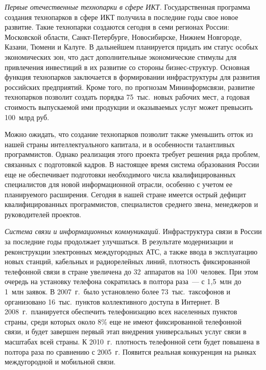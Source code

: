 \begin{multicols}{2}
     \vspace*{1pt}
     \textit{Первые отечественные технопарки в сфере ИКТ.} Государственная
программа создания технопарков в сфере ИКТ получила в последние годы свое новое
развитие. Такие технопарки создаются сегодня в семи регионах России: Московской
области, Санкт-Петербурге, Новосибирске, Нижнем Новгороде, Казани, Тюмени и Калуге.
В дальнейшем планируется придать им статус особых экономических зон, что даст
дополнительные экономические стимулы для привлечения инвестиций в их развитие со
стороны бизнес-структур. Основная функция технопарков заключается в формировании
инфраструктуры для развития российских предприятий. Кроме того, по прогнозам
Мининформсвязи, развитие технопарков позволит создать порядка 75~тыс.\ новых
рабочих мест, а годовая стоимость выпускаемой ими продукции и оказываемых услуг
может превысить 100~млрд руб.

     Можно ожидать, что создание технопарков позволит также уменьшить отток из
нашей страны интеллектуального капитала, и в особенности та\-лант\-ли\-вых программистов.
Однако реализация этого проекта требует решения ряда проблем, связанных с
подготовкой кадров. В настоящее время система образования России еще не обеспечивает
подготовки необходимого числа квалифицированных специалистов для новой
информационной отрасли, особенно с учетом ее планируемого расширения. Сегодня в
нашей стране имеется острый дефицит квалифицированных программистов, специалистов
среднего звена, менеджеров и руководителей проектов.

     \vspace*{1pt}
     \textit{Система связи и информационных коммуникаций.} Инфраструктура связи в
России за последние годы продолжает улучшаться. В результате модернизации и
реконструкции электронных междугородных АТС, а также ввода в эксплуатацию новых
станций, кабельных и радиорелейных линий, плотность фиксированной телефонной связи
в стране увеличена до 32~аппаратов на 100~человек. При этом очередь на установку
телефона сократилась в полтора раза~--- с 1,5~млн до 1~млн заявок. В 2007~г.\ было
установлено более 73~тыс.\ таксофонов и организовано 16~тыс.\ пунктов коллективного
доступа в Интернет. В 2008~г.\ планируется обеспечить телефонизацию всех населенных
пунктов страны, среди которых около 8\% еще не имеют фиксированной телефонной
связи, и будет завершен первый этап внедрения универсальных услуг связи в масштабах
всей страны. К 2010~г.\ плотность телефонной сети будет повышена в полтора раза по
сравнению с 2005~г. Появится реальная конкуренция на рынках междугородной и
мобильной связи.


\end{multicols}
